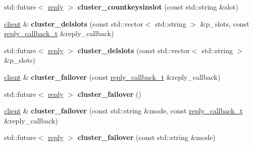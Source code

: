 \begin{DoxyCompactItemize}
\item 
\mbox{\label{classcpp__redis_1_1client_a8135eee3cfc95b061aee9b6f7271efce}} 
std\+::future$<$ \hyperlink{classcpp__redis_1_1reply}{reply} $>$ {\bfseries cluster\+\_\+countkeysinslot} (const std\+::string \&slot)
\item 
\mbox{\label{classcpp__redis_1_1client_a41f96bb9a627724570f1866d0983d7b2}} 
\hyperlink{classcpp__redis_1_1client}{client} \& {\bfseries cluster\+\_\+delslots} (const std\+::vector$<$ std\+::string $>$ \&p\+\_\+slots, const \hyperlink{classcpp__redis_1_1client_a061a1140d36d2eaeda82b09a0bb3f9f2}{reply\+\_\+callback\+\_\+t} \&reply\+\_\+callback)
\item 
\mbox{\label{classcpp__redis_1_1client_a6cd07520f60ee78c4603211273adcf46}} 
std\+::future$<$ \hyperlink{classcpp__redis_1_1reply}{reply} $>$ {\bfseries cluster\+\_\+delslots} (const std\+::vector$<$ std\+::string $>$ \&p\+\_\+slots)
\item 
\mbox{\label{classcpp__redis_1_1client_a5afcee001e210150803a95c3d6412998}} 
\hyperlink{classcpp__redis_1_1client}{client} \& {\bfseries cluster\+\_\+failover} (const \hyperlink{classcpp__redis_1_1client_a061a1140d36d2eaeda82b09a0bb3f9f2}{reply\+\_\+callback\+\_\+t} \&reply\+\_\+callback)
\item 
\mbox{\label{classcpp__redis_1_1client_a76122bb138c12b90c78c4e511f45ef17}} 
std\+::future$<$ \hyperlink{classcpp__redis_1_1reply}{reply} $>$ {\bfseries cluster\+\_\+failover} ()
\item 
\mbox{\label{classcpp__redis_1_1client_a9c95de64e422c09c2180dc69db386d06}} 
\hyperlink{classcpp__redis_1_1client}{client} \& {\bfseries cluster\+\_\+failover} (const std\+::string \&mode, const \hyperlink{classcpp__redis_1_1client_a061a1140d36d2eaeda82b09a0bb3f9f2}{reply\+\_\+callback\+\_\+t} \&reply\+\_\+callback)
\item 
\mbox{\label{classcpp__redis_1_1client_a06f9c7d27f961787b01a01be95f1fa29}} 
std\+::future$<$ \hyperlink{classcpp__redis_1_1reply}{reply} $>$ {\bfseries cluster\+\_\+failover} (const std\+::string \&mode)

\end{DoxyCompactItemize}
